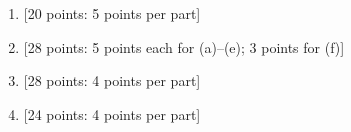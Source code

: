 \documentclass[11pt]{article}
\begin{document}
\newpage
\setcounter{page}{1}
\begin{enumerate}
\newpage\vspace*{0em}
\item {[20 points: 5 points per part]}



\newpage\vspace*{0em}
\item {[28 points: 5 points each for (a)--(e); 3 points for (f)]}



\newpage\vspace*{0em}
\item {[28 points: 4 points per part]}



\newpage\vspace*{0em}
\item {[24 points: 4 points per part]}



\end{enumerate}
\end{document}
